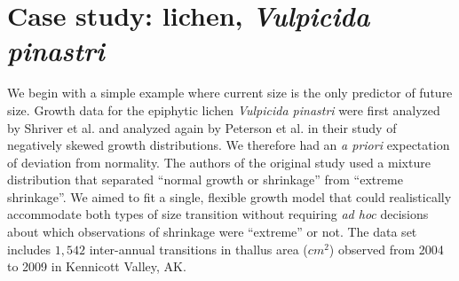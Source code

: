 \documentclass[12pt]{article}
\begin{document}
\section{Case study: lichen, \emph{Vulpicida pinastri}}
We begin with a simple example where current size is the only predictor of future size. 
Growth data for the epiphytic lichen \emph{Vulpicida pinastri} were first analyzed by Shriver et al. \citeyear{shriver2012comparative} and analyzed again by Peterson et al. \citeyear{peterson2019improving} in their study of negatively skewed growth distributions. 
We therefore had an \emph{a priori} expectation of deviation from normality. 
The authors of the original study used a mixture distribution that separated ``normal growth or shrinkage'' from ``extreme shrinkage''. 
We aimed to fit a single, flexible growth model that could realistically accommodate both types of size transition without requiring \emph{ad hoc} decisions about which observations of shrinkage were ``extreme'' or not.
The data set includes $1,542$ inter-annual transitions in thallus area ($cm^2$) observed from 2004 to 2009 in Kennicott Valley, AK. 
\end{document}
